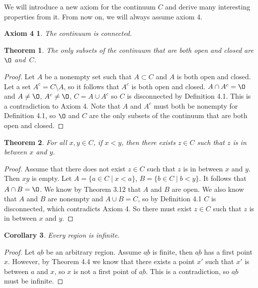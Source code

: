 \documentclass[12pt]{article}
\renewcommand{\emptyset}{\O}
\renewcommand{\_}[1]{\underline{ #1 }}
\newtheorem{theorem}{Theorem}[section]
\newtheorem{corollary}[theorem]{Corollary}
\newtheorem*{axiom4}{Axiom 4}
\theoremstyle{definition}
\numberwithin{equation}{subsection}
\begin{document}
We will introduce a new axiom for the continuum $C$ and derive many interesting properties from it.  From now on, we will always assume axiom 4.

\medskip

\begin{axiom4}
The continuum is connected.
\end{axiom4}

\begin{theorem}
The only subsets of the continuum that are both open and closed are $\emptyset$ and~$C$.
\end{theorem}

\begin{proof}

Let $A$ be a nonempty set such that $A \subset C$ and $A$ is both open and closed. Let a set $A^c = C \setminus A$, so it follows that $A^c$ is both open and closed. $A \cap A^c = \emptyset$ and $A \not = \emptyset$, $A^c \not = \emptyset$, $C = A \cup A^c$ so $C$ is disconnected by Definition 4.1. This is a contradiction to Axiom 4. Note that $A$ and $A^c$ must both be nonempty for Definition 4.1, so $\emptyset$ and $C$ are the only subsets of the continuum that are both open and closed.
\end{proof}

\begin{theorem}
For all $x, y \in C$, if $x < y$, then there exists $z \in C$ such that $z$ is in between $x$ and $y$.
\end{theorem}

\begin{proof}
Assume that there does not exist $z \in C$ such that $z$ is in between $x$ and $y$. Then $\_{xy}$ is empty. Let $A = \{a \in C \mid x < a\}$, $B = \{b \in C \mid b < y\}$. It follows that $A \cap B = \emptyset$. We know by Theorem 3.12 that $A$ and $B$ are open. We also know that $A$ and $B$ are nonempty and $A \cup B = C$, so by Definition 4.1 $C$ is disconnected, which contradicts Axiom 4. So there must exist $z \in C$ such that $z$ is in between $x$ and $y$.
\end{proof}

\begin{corollary}  Every region is infinite.
\end{corollary}

\begin{proof}
Let $\_{ab}$ be an arbitrary region. Assume $\_{ab}$ is finite, then $\_{ab}$ has a first point $x$. However, by Theorem 4.4 we know that there exists a point $x'$ such that $x'$ is between $a$ and $x$, so $x$ is not a first point of $\_{ab}$. This is a contradiction, so $\_{ab}$ must be infinite.
\end{proof}
\end{document}
